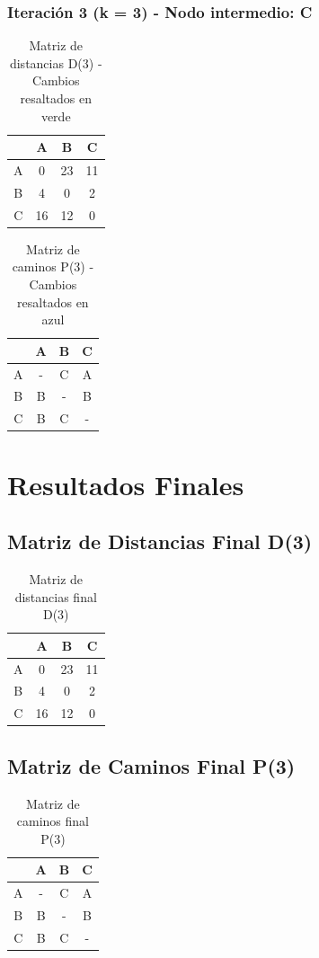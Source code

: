 \documentclass[12pt]{article}
\begin{document}
\subsubsection{Iteración 3 (k = 3) - Nodo intermedio: C}
\begin{table}[h!]
\centering
\begin{tabular}{|c|c|c|c|}
\hline
 & A & B & C \\\hline
A & 0 & \cellcolor{lightgreen} 23 & 11 \\\hline
B & 4 & 0 & 2 \\\hline
C & 16 & 12 & 0 \\\hline
\end{tabular}
\caption{Matriz de distancias D(3) - Cambios resaltados en verde}
\end{table}

\begin{table}[h!]
\centering
\begin{tabular}{|c|c|c|c|}
\hline
 & A & B & C \\\hline
A & - & \cellcolor{lightblue} C & A \\\hline
B & B & - & B \\\hline
C & B & C & - \\\hline
\end{tabular}
\caption{Matriz de caminos P(3) - Cambios resaltados en azul}
\end{table}

\clearpage
\section{Resultados Finales}
\subsection{Matriz de Distancias Final D(3)}
\begin{table}[h!]
\centering
\begin{tabular}{|c|c|c|c|}
\hline
 & A & B & C \\\hline
A & 0 & 23 & 11 \\\hline
B & 4 & 0 & 2 \\\hline
C & 16 & 12 & 0 \\\hline
\end{tabular}
\caption{Matriz de distancias final D(3)}
\end{table}

\clearpage
\subsection{Matriz de Caminos Final P(3)}
\begin{table}[h!]
\centering
\begin{tabular}{|c|c|c|c|}
\hline
 & A & B & C \\\hline
A & - & C & A \\\hline
B & B & - & B \\\hline
C & B & C & - \\\hline
\end{tabular}
\caption{Matriz de caminos final P(3)}
\end{table}
\end{document}
